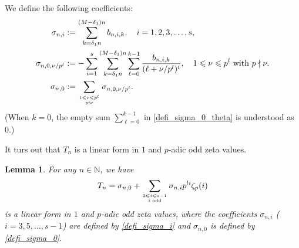 \documentclass[12pt]{article}
\newtheorem{lemma}[theorem]{Lemma}
\numberwithin{equation}{section}
\begin{document}
\bigskip

We define the following coefficients: 
\begin{align}
	\sigma_{n,i} &:= \sum_{k=\delta_1n}^{(M-\delta_1)n} b_{n,i,k}, \quad i=1,2,3,\ldots,s, \label{defi_sigma_i} \\
	\sigma_{n,0,\nu/p^l} &:= -\sum_{i=1}^{s}\sum_{k=\delta_1n}^{(M-\delta_1)n}\sum_{\ell=0}^{k-1} \frac{b_{n,i,k}}{(\ell+\nu/p^l)^i}, \quad 1 \leqslant \nu \leqslant p^l \text{~with~} p \nmid \nu. \label{defi_sigma_0_theta} \\
	\sigma_{n,0} &:= \sum_{1 \leqslant \nu \leqslant p^l \atop p \nmid \nu} \sigma_{n,0,\nu/p^l}. \label{defi_sigma_0}
\end{align}
(When $k=0$, the empty sum $\sum_{\ell=0}^{k-1}$ in \eqref{defi_sigma_0_theta} is understood as $0$.)

It turs out that $T_{n}$ is a linear form in $1$ and $p$-adic odd zeta values.

\begin{lemma}\label{lem_linear_form_p}
For any $n \in \mathbb{N}$, we have
\[ T_n = \sigma_{n,0} + \sum_{3 \leqslant i \leqslant s-1 \atop i \text{~odd}} \sigma_{n,i} p^{li} \zeta_p(i)  \]
is a linear form in $1$ and $p$-adic odd zeta values, where the coefficients $\sigma_{n,i}$ ($i=3,5,\ldots,s-1$) are defined by \eqref{defi_sigma_i} and $\sigma_{n,0}$ is defined by \eqref{defi_sigma_0}.
\end{lemma}
\end{document}
